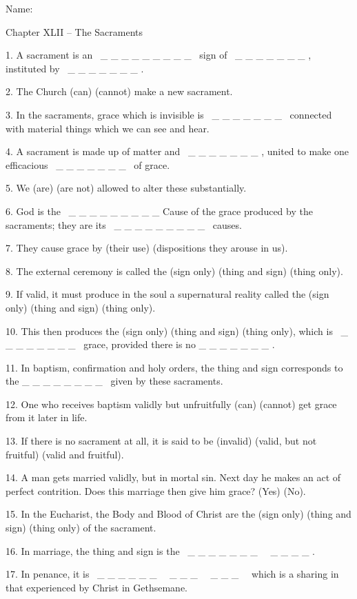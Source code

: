 \documentclass[a4paper]{article}
\title{}
\begin{document}
Name:

Chapter XLII -- The Sacraments

1. A sacrament is an \ \_ \_ \_ \_ \_ \_ \_ \_ \_ \ sign of \ \_ \_ \_ \_ \_ \_ \_ , instituted by \ \_ \_ \_ \_ \_ \_ \_ .

2. The Church (can) (cannot) make a new sacrament.

3. In the sacraments, grace which is invisible is \ \_ \_ \_ \_ \_ \_ \_ \ connected with material things which we can see and hear.

4. A sacrament is made up of matter and \ \_ \_ \_ \_ \_ \_ \_ , united to make one efficacious \ \_ \_ \_ \_ \_ \_ \_ \ of grace.

5. We (are) (are not) allowed to alter these substantially.

6. God is the \ \_ \_ \_ \_ \_ \_ \_ \_ \_ Cause of the grace produced by the sacraments; they are its \ \_ \_ \_ \_ \_ \_ \_ \_ \_ \ causes.

7. They cause grace by (their use) (dispositions they arouse in us).

8. The external ceremony is called the (sign only) (thing and sign) (thing only).

9. If valid, it must produce in the soul a supernatural reality called the (sign only) (thing and sign) (thing only).

10. This then produces the (sign only) (thing and sign) (thing only), which is \ \_ \_ \_ \_ \_ \_ \_ \_ \ grace, provided there is no \_ \_ \_ \_ \_ \_ \_ .

11. In baptism, confirmation and holy orders, the thing and sign corresponds to the \_ \_ \_ \_ \_ \_ \_ \_ \ given by these sacraments.

12. One who receives baptism validly but unfruitfully (can) (cannot) get grace from it later in life.

13. If there is no sacrament at all, it is said to be (invalid) (valid, but not fruitful) (valid and fruitful).

14. A man gets married validly, but in mortal sin. Next day he makes an act of perfect contrition. Does this marriage then give him grace? (Yes) (No).

15. In the Eucharist, the Body and Blood of Christ are the (sign only) (thing and sign) (thing only) of the sacrament.

16. In marriage, the thing and sign is the \ \_ \_ \_ \_ \_ \_ \_ \ \ \_ \_ \_ \_ .

17. In penance, it is \ \_ \_ \_ \_ \_ \_ \ \ \_ \_ \_ \ \ \_ \_ \_ \ \ which is a sharing in that experienced by Christ in Gethsemane.
\end{document}

